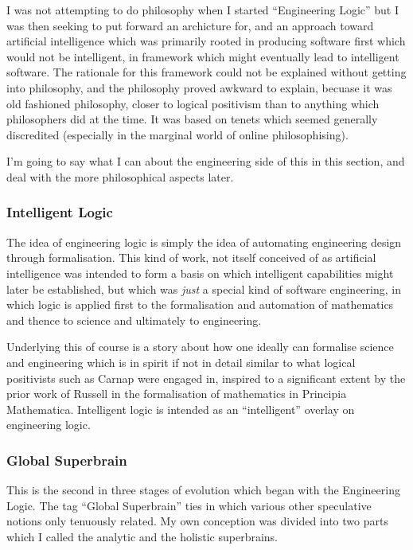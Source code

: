 \documentclass{rbjk}
\begin{document}
\begin{article}
I was not attempting to do philosophy when I started ``Engineering Logic'' but I was then seeking to put forward an archicture for, and an approach toward artificial intelligence which was primarily rooted in producing software first which would not be intelligent, in framework which might eventually lead to intelligent software.
The rationale for this framework could not be explained without getting into philosophy, and the philosophy proved awkward to explain, becuase it was old fashioned philosophy, closer to logical positivism than to anything which philosophers did at the time.
It was based on tenets which seemed generally discredited (especially in the marginal world of online philosophising).

I'm going to say what I can about the engineering side of this in this section, and deal with the more philosophical aspects later.

\subsubsection{Intelligent Logic}

The idea of engineering logic is simply the idea of automating engineering design through formalisation.
This kind of work, not itself conceived of as artificial intelligence was intended to form a basis on which intelligent capabilities might later be established, but which was {\it just} a special kind of software engineering, in which logic is applied first to the formalisation and automation of mathematics and thence to science and ultimately to engineering.

Underlying this of course is a story about how one ideally can formalise science and engineering which is in spirit if not in detail similar to what logical positivists such as Carnap were engaged in, inspired to a significant extent by the prior work of Russell in the formalisation of mathematics in Principia Mathematica.
Intelligent logic is intended as an ``intelligent'' overlay on engineering logic.

\subsubsection{Global Superbrain}

This is the second in three stages of evolution which began with the Engineering Logic.
The tag ``Global Superbrain'' ties in which various other speculative notions only tenuously related.
My own conception was divided into two parts which I called the analytic and the holistic superbrains.


\end{article}
\end{document}
